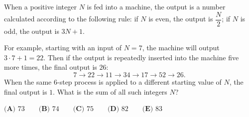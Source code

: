 When a positive integer $N$ is fed into a machine, the output is a number calculated according to the following rule: if $N$ is even, the output is $\dfrac N2$; if $N$ is odd, the output is $3N+1$.

For example, starting with an input of $N=7$, the machine will output $3\cdot7+1=22$. Then if the output is repeatedly inserted into the machine five more times, the final output is $26$:
\[7\to22\to11\to34\to17\to52\to26.\]
When the same $6$-step process is applied to a different starting value of $N$, the final output is $1$. What is the sum of all such integers $N$?

$\textbf{(A) }73 \qquad \textbf{(B) }74 \qquad \textbf{(C) }75 \qquad \textbf{(D) }82 \qquad \textbf{(E) }83$
